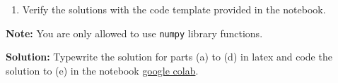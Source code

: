 \documentclass[11pt,letterpaper]{article}
\begin{document}
\begin{enumerate}
\begin{enumerate}[label=(\alph*)]
\begin{enumerate}
  \end{enumerate}
\item Verify the solutions with the code template provided in the notebook. 
\end{enumerate}
\textbf{Note:} You are only allowed to use \texttt{numpy} library functions.

\textbf{Solution:}
Typewrite the solution for parts (a) to (d) in latex and code the solution to (e) in the notebook \href{https://colab.research.google.com/drive/1lAyQW20omCqQD04MxgjxkkFCrvm4s_bF?usp=sharing}{google colab}.



\end{enumerate}


\end{document}
